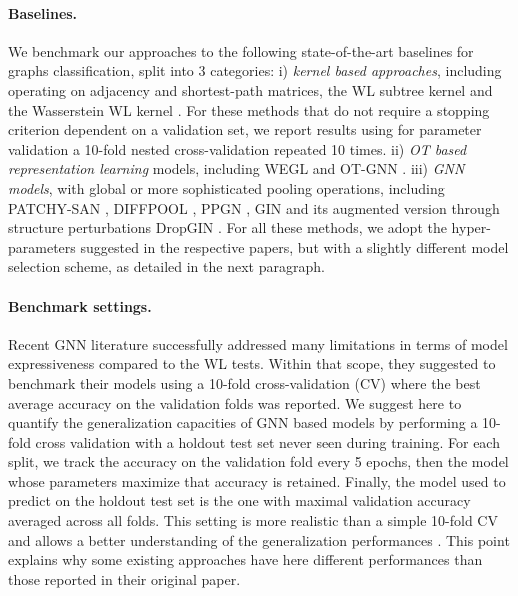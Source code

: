 \documentclass{article}
\begin{document}
\paragraph{Baselines.} We benchmark our approaches to the following
state-of-the-art baselines for graphs classification, split into 3 categories:
i) \emph{kernel based approaches}, including  \cite{titouan2019optimal} operating on
adjacency and shortest-path matrices, the WL subtree kernel
\cite[WL]{shervashidze2011weisfeiler} and the Wasserstein WL kernel
\cite[WWL]{Togninalli19}. For these methods that do not require a stopping criterion
dependent on a validation set, we report results using for parameter validation a 10-fold nested cross-validation
\cite{titouan2019optimal,kriege2020survey} repeated 10 times. 
ii) \emph{OT based representation learning} models, including WEGL
\cite{kolouri2020wasserstein} and OT-GNN \cite{chen2020optimal}. iii) \emph{GNN models},
with global or more sophisticated pooling operations, including PATCHY-SAN
\cite{niepert2016learning}, DIFFPOOL \cite{ying2018hierarchical}, PPGN
\cite{maron2019provably}, GIN \cite{xu2018powerful} and its augmented version
through structure perturbations DropGIN \cite{papp2021dropgnn}.
For all these methods, we adopt the hyper-parameters suggested in the respective  papers, but with a slightly different model selection scheme, as detailed in the next paragraph.



\paragraph{Benchmark settings.} Recent GNN literature \cite{maron2018invariant,
xu2018powerful,maron2019provably,papp2021dropgnn} successfully addressed many
limitations in terms of model expressiveness compared to the WL tests.
Within that scope, they suggested to benchmark their models using a 10-fold
cross-validation (CV) where the best average accuracy on the validation folds was
reported. We suggest here to quantify the generalization capacities of GNN based
models by performing a 10-fold cross validation with a holdout test set never
seen during training. For each split, we track the accuracy on the validation
fold every 5 epochs, then the model whose parameters maximize that
accuracy is retained. Finally, the model used to predict on the holdout test set is the one with maximal validation accuracy averaged across all 
folds. This setting is more realistic than a simple 10-fold
CV and allows a better understanding of the generalization performances \cite{bengio2003no}. This point explains why some existing approaches have here different performances than those reported in their original paper.
\end{document}
